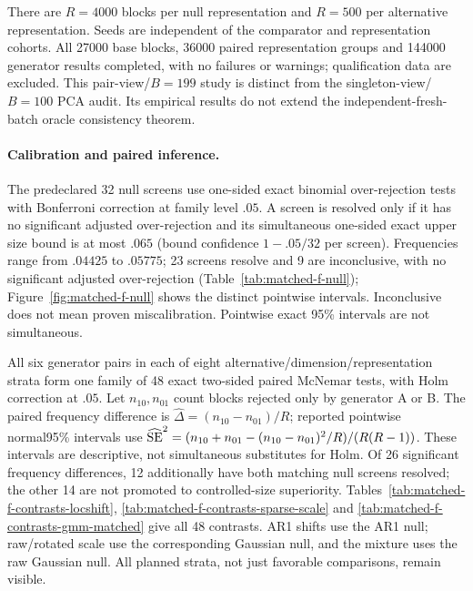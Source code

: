 {There are $R=4000$ blocks per null representation and $R=500$ per alternative
representation. Seeds are independent of the comparator and representation cohorts. All 27000 base blocks, 36000 paired representation groups and 144000
generator results completed, with no failures or warnings; qualification data
are excluded. This pair-view/$B=199$ study is distinct from the
singleton-view/$B=100$ PCA audit. Its empirical results do not extend the
independent-fresh-batch oracle consistency theorem.

\paragraph{Calibration and paired inference.}
The predeclared 32 null screens use one-sided exact binomial over-rejection
tests with Bonferroni correction at family level $.05$. A screen is resolved
only if it has no significant adjusted over-rejection and its simultaneous
one-sided exact upper size bound is at most $.065$ (bound confidence
$1-.05/32$ per screen). Frequencies range from $.04425$ to $.05775$;
23 screens resolve and 9 are inconclusive, with no significant adjusted
over-rejection (Table~\ref{tab:matched-f-null}); Figure~\ref{fig:matched-f-null}
shows the distinct pointwise intervals. Inconclusive does not mean
proven miscalibration. Pointwise exact 95\% intervals are not simultaneous.

All six generator pairs in each of eight alternative/dimension/representation
strata form one family of 48 exact two-sided paired McNemar tests, with Holm
correction at $.05$. Let $n_{10},n_{01}$ count blocks rejected only by generator
A or B. The paired frequency difference is
$\widehat\Delta=(n_{10}-n_{01})/R$; reported pointwise normal95\% intervals use
$\widehat{\rm SE}^2=(n_{10}+n_{01}-(n_{10}-n_{01})^2/R)/(R(R-1))$.
These intervals are descriptive, not simultaneous substitutes for Holm.
Of 26 significant frequency differences, 12 additionally have both matching
null screens resolved; the other 14 are not promoted to controlled-size
superiority. Tables~\ref{tab:matched-f-contrasts-locshift},
\ref{tab:matched-f-contrasts-sparse-scale} and
\ref{tab:matched-f-contrasts-gmm-matched} give all 48 contrasts.
AR1 shifts use the AR1 null; raw/rotated scale use the corresponding
Gaussian null, and the mixture uses the raw Gaussian null. All planned strata,
not just favorable comparisons, remain visible.

}
